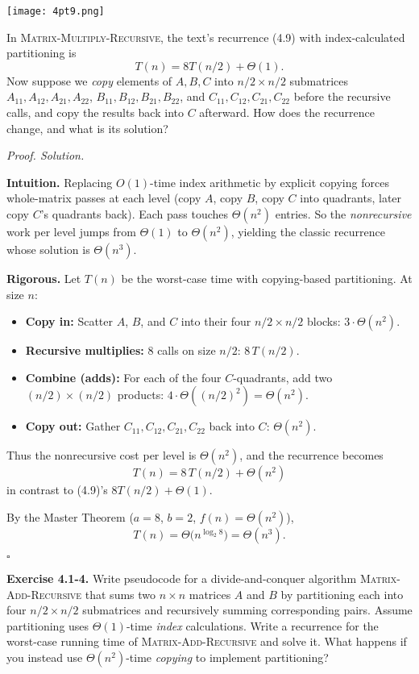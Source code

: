 \documentclass[12pt]{article}
\theoremstyle{definition}
\begin{document}
\begin{center}
    \texttt{[image: 4pt9.png]}
\end{center}

In \textsc{Matrix-Multiply-Recursive}, the text’s recurrence (4.9) with index-calculated
partitioning is
\[
T(n)=8T(n/2)+\Theta(1).
\]
Now suppose we \emph{copy} elements of $A,B,C$ into $n/2\times n/2$ submatrices
$A_{11},A_{12},A_{21},A_{22}$, $B_{11},B_{12},B_{21},B_{22}$, and
$C_{11},C_{12},C_{21},C_{22}$ before the recursive calls, and copy the results back into $C$ afterward.
How does the recurrence change, and what is its solution?

\medskip
\noindent\textit{Proof. Solution.}

\noindent\textbf{Intuition.}
Replacing $O(1)$-time index arithmetic by explicit copying forces whole-matrix
passes at each level (copy $A$, copy $B$, copy $C$ into quadrants, later copy $C$’s quadrants back).
Each pass touches $\Theta(n^2)$ entries. So the \emph{nonrecursive} work per level
jumps from $\Theta(1)$ to $\Theta(n^2)$, yielding the classic recurrence whose solution is $\Theta(n^3)$.

\noindent\textbf{Rigorous.}
Let $T(n)$ be the worst-case time with copying-based partitioning. At size $n$:
\begin{itemize}
  \item \textbf{Copy in:} Scatter $A$, $B$, and $C$ into their four $n/2\times n/2$ blocks:
        $3\cdot \Theta(n^2)$.
  \item \textbf{Recursive multiplies:} $8$ calls on size $n/2$: $8\,T(n/2)$.
  \item \textbf{Combine (adds):} For each of the four $C$-quadrants, add two $(n/2)\times(n/2)$
        products: $4\cdot \Theta((n/2)^2)=\Theta(n^2)$.
  \item \textbf{Copy out:} Gather $C_{11},C_{12},C_{21},C_{22}$ back into $C$: $\Theta(n^2)$.
\end{itemize}
Thus the nonrecursive cost per level is $\Theta(n^2)$, and the recurrence becomes
\[
\boxed{\,T(n)=8\,T(n/2)+\Theta(n^2)\,}
\]
in contrast to (4.9)’s $8T(n/2)+\Theta(1)$.

By the Master Theorem ($a=8$, $b=2$, $f(n)=\Theta(n^2)$),
\[
T(n)=\Theta\!\big(n^{\log_2 8}\big)=\Theta(n^3).
\]

\hfill$\square$

\newpage

\noindent\textbf{Exercise 4.1-4.}
Write pseudocode for a divide-and-conquer algorithm \textsc{Matrix-Add-Recursive}
that sums two $n\times n$ matrices $A$ and $B$ by partitioning each into four
$n/2\times n/2$ submatrices and recursively summing corresponding pairs.
Assume partitioning uses $\Theta(1)$-time \emph{index} calculations.
Write a recurrence for the worst-case running time of \textsc{Matrix-Add-Recursive} and solve it.
What happens if you instead use $\Theta(n^2)$-time \emph{copying} to implement partitioning?
\end{document}
